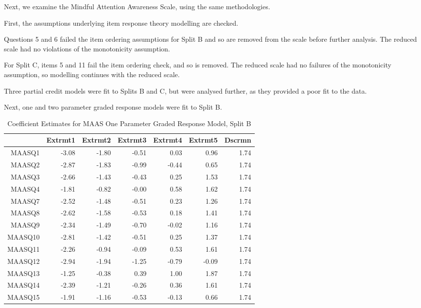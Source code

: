 \documentclass{article}
\begin{document}
Next, we examine the Mindful Attention Awareness Scale, using the same methodologies. 

First, the assumptions underlying item response theory modelling are checked. 



Questions 5 and 6 failed the item ordering assumptions for Split B and so are removed from the scale before further analysis. The reduced scale had no violations of the monotonicity assumption. 


For Split C, items 5 and 11 fail the item ordering check, and so is removed. The reduced scale had no failures of the monotonicity assumption, so modelling continues with the reduced scale. 








Three partial credit models were fit to Splits B and C, but were analysed further, as they provided a poor fit to the data. 

Next, one and two parameter graded response models were fit to Split B. 



\begin{table}[ht]
\centering
\begin{tabular}{rrrrrrr}
  \hline
 & Extrmt1 & Extrmt2 & Extrmt3 & Extrmt4 & Extrmt5 & Dscrmn \\ 
  \hline
MAASQ1 & -3.08 & -1.80 & -0.51 & 0.03 & 0.96 & 1.74 \\ 
  MAASQ2 & -2.87 & -1.83 & -0.99 & -0.44 & 0.65 & 1.74 \\ 
  MAASQ3 & -2.66 & -1.43 & -0.43 & 0.25 & 1.53 & 1.74 \\ 
  MAASQ4 & -1.81 & -0.82 & -0.00 & 0.58 & 1.62 & 1.74 \\ 
  MAASQ7 & -2.52 & -1.48 & -0.51 & 0.23 & 1.26 & 1.74 \\ 
  MAASQ8 & -2.62 & -1.58 & -0.53 & 0.18 & 1.41 & 1.74 \\ 
  MAASQ9 & -2.34 & -1.49 & -0.70 & -0.02 & 1.16 & 1.74 \\ 
  MAASQ10 & -2.81 & -1.42 & -0.51 & 0.25 & 1.37 & 1.74 \\ 
  MAASQ11 & -2.26 & -0.94 & -0.09 & 0.53 & 1.61 & 1.74 \\ 
  MAASQ12 & -2.94 & -1.94 & -1.25 & -0.79 & -0.09 & 1.74 \\ 
  MAASQ13 & -1.25 & -0.38 & 0.39 & 1.00 & 1.87 & 1.74 \\ 
  MAASQ14 & -2.39 & -1.21 & -0.26 & 0.36 & 1.61 & 1.74 \\ 
  MAASQ15 & -1.91 & -1.16 & -0.53 & -0.13 & 0.66 & 1.74 \\ 
   \hline
\end{tabular}
\caption{Coefficient Estimates for MAAS One Parameter Graded Response Model, Split B} 
\label{tab:maas2bgrm1pl}
\end{table}
\end{document}

